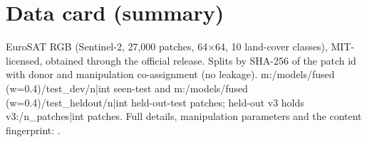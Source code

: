 \section{Data card (summary)}\label{app:data}
EuroSAT RGB (Sentinel-2, 27,000 patches, 64$\times$64, 10 land-cover classes), MIT-licensed, obtained through the official release. Splits by SHA-256 of the patch id with donor and manipulation co-assignment (no leakage). {{m:/models/fused (w=0.4)/test_dev/n|int}} seen-test and {{m:/models/fused (w=0.4)/test_heldout/n|int}} held-out-test patches; held-out v3 holds {{v3:/n_patches|int}} patches. Full details, manipulation parameters and the content fingerprint: .
